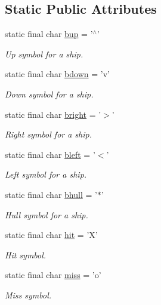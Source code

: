 \subsection*{Static Public Attributes}
\begin{DoxyCompactItemize}
\item 
static final char \hyperlink{classbattleShip_1_1Board_a1182aaa1c9965e82514001411e92deda}{bup} = '$^\wedge$'
\begin{DoxyCompactList}\small\item\em Up symbol for a ship. \end{DoxyCompactList}\item 
static final char \hyperlink{classbattleShip_1_1Board_a0fdd0fa1e2c590cccc27daf05aa9cf6b}{bdown} = 'v'
\begin{DoxyCompactList}\small\item\em Down symbol for a ship. \end{DoxyCompactList}\item 
static final char \hyperlink{classbattleShip_1_1Board_a9d97dd87cddd014a15af04801920d50e}{bright} = '$>$'
\begin{DoxyCompactList}\small\item\em Right symbol for a ship. \end{DoxyCompactList}\item 
static final char \hyperlink{classbattleShip_1_1Board_a6db9e34520009f40729eb730ee6cb509}{bleft} = '$<$'
\begin{DoxyCompactList}\small\item\em Left symbol for a ship. \end{DoxyCompactList}\item 
static final char \hyperlink{classbattleShip_1_1Board_a73ed34c95d608cdb748ff950841307d7}{bhull} = '$\ast$'
\begin{DoxyCompactList}\small\item\em Hull symbol for a ship. \end{DoxyCompactList}\item 
static final char \hyperlink{classbattleShip_1_1Board_a46a888460556cbefb33d9cb048a610fc}{hit} = 'X'
\begin{DoxyCompactList}\small\item\em Hit symbol. \end{DoxyCompactList}\item 
static final char \hyperlink{classbattleShip_1_1Board_a8c0a9cd8bd0c3829c01dccd8466c8ee6}{miss} = 'o'
\begin{DoxyCompactList}\small\item\em Miss symbol. \end{DoxyCompactList}\item 

\end{DoxyCompactItemize}
